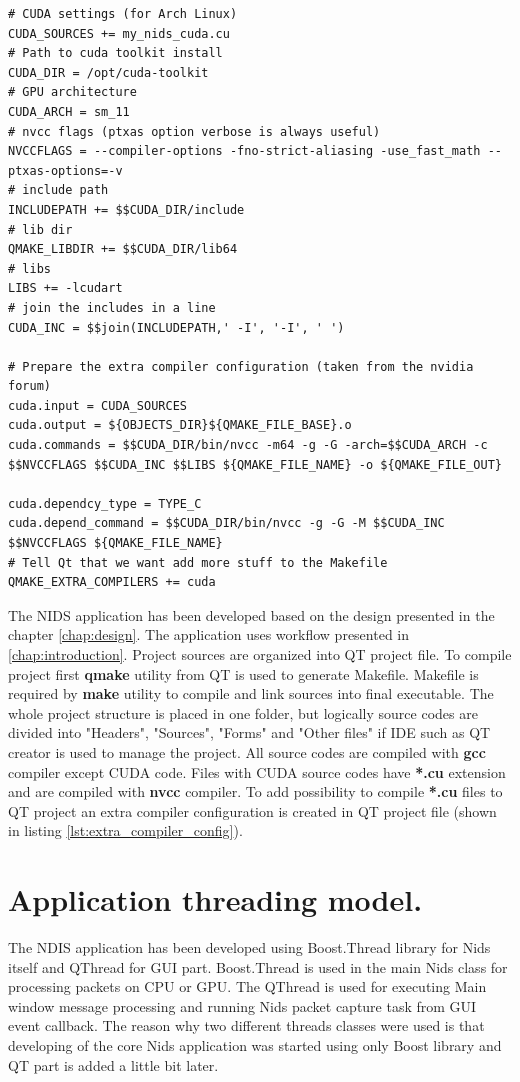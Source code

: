 \documentclass[thesis=M,english]{FITthesis}[2011/07/15]
\begin{document}
\begin{lstlisting}
# CUDA settings (for Arch Linux)
CUDA_SOURCES += my_nids_cuda.cu
# Path to cuda toolkit install
CUDA_DIR = /opt/cuda-toolkit
# GPU architecture
CUDA_ARCH = sm_11
# nvcc flags (ptxas option verbose is always useful)
NVCCFLAGS = --compiler-options -fno-strict-aliasing -use_fast_math --ptxas-options=-v
# include path
INCLUDEPATH += $$CUDA_DIR/include
# lib dir
QMAKE_LIBDIR += $$CUDA_DIR/lib64
# libs
LIBS += -lcudart
# join the includes in a line
CUDA_INC = $$join(INCLUDEPATH,' -I', '-I', ' ')

# Prepare the extra compiler configuration (taken from the nvidia forum)
cuda.input = CUDA_SOURCES
cuda.output = ${OBJECTS_DIR}${QMAKE_FILE_BASE}.o
cuda.commands = $$CUDA_DIR/bin/nvcc -m64 -g -G -arch=$$CUDA_ARCH -c $$NVCCFLAGS $$CUDA_INC $$LIBS ${QMAKE_FILE_NAME} -o ${QMAKE_FILE_OUT}

cuda.dependcy_type = TYPE_C
cuda.depend_command = $$CUDA_DIR/bin/nvcc -g -G -M $$CUDA_INC $$NVCCFLAGS ${QMAKE_FILE_NAME}
# Tell Qt that we want add more stuff to the Makefile
QMAKE_EXTRA_COMPILERS += cuda
\end{lstlisting}

The NIDS application has been developed based on the design presented in the chapter \ref{chap:design}. The application uses workflow presented in \ref{chap:introduction}. Project sources are organized into QT project file. To compile project first \textbf{qmake} utility from QT is used to generate Makefile. Makefile is required by \textbf{make} utility to compile and link sources into final executable. The whole project structure is placed in one folder, but logically source codes are divided into "Headers", "Sources", "Forms" and "Other files" if IDE such as QT creator is used to manage the project. All source codes are compiled with \textbf{gcc} compiler except CUDA code. Files with CUDA source codes have \textbf{*.cu} extension and are compiled with \textbf{nvcc} compiler. To add possibility to compile \textbf{*.cu} files to QT project an extra compiler configuration is created in QT project file (shown in listing \ref{lst:extra_compiler_config}).

\section{Application threading model.}
The NDIS application has been developed using Boost.Thread library for Nids itself and QThread for GUI part. Boost.Thread is used in the main Nids class for processing packets on CPU or GPU. The QThread is used for executing Main window message processing and running Nids packet capture task from GUI event callback. The reason why two different threads classes were used is that developing of the core Nids application was started using only Boost library and QT part is added a little bit later.
\end{document}
